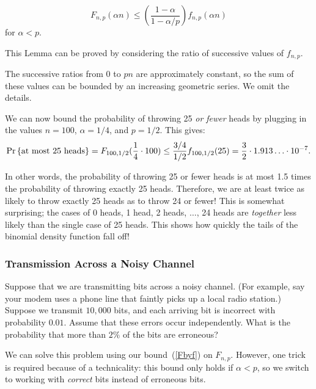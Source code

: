 \documentclass[11pt,twoside]{article}
\begin{document}
\begin{lemma*}
\begin{equation}\label{Fbyf}
F_{n, p}(\alpha n) \leq
\left(\frac{1 - \alpha}{1 - \alpha/p}\right) f_{n, p}(\alpha n)
\end{equation}
for $\alpha < p$.
\end{lemma*}

This Lemma can be proved by considering the ratio of successive values of
$f_{n, p}$.  %

The successive ratios from 0 to $pn$ are approximately
constant, so the sum of these values can be bounded by an increasing
geometric series.  We omit the details.


We can now bound the probability of throwing 25 \emph{or fewer} heads by
plugging in the values $n = 100$, $\alpha = 1/4$, and $p = 1/2$.  This
gives:
\begin{equation*}
\mathop{\textup{Pr}}\nolimits\left\{\mbox{at most 25 heads}\right\}
   = F_{100, 1/2}(\frac{1}{4} \cdot 100)
   \leq \frac{3/4}{1/2} f_{100, 1/2}(25)
   = \frac{3}{2} \cdot 1.913\ldots \cdot 10^{-7}.
\end{equation*}

In other words, the probability of throwing 25 or fewer heads is at most
1.5 times the probability of throwing exactly 25 heads.  Therefore, we are
at least twice as likely to throw exactly 25 heads as to throw 24 or
fewer!  This is somewhat surprising; the cases of 0 heads, 1 head, 2
heads, $\dots$, 24 heads are \emph{together} less likely than the single
case of 25 heads.  This shows how quickly the tails of the binomial
density function fall off!

\subsubsection{Transmission Across a Noisy Channel}\label{noisy}

Suppose that we are transmitting bits across a noisy channel.  (For
example, say your modem uses a phone line that faintly picks up a
local radio station.)  Suppose we transmit $10,000$ bits, and each
arriving bit is incorrect with probability $0.01$.  Assume that these
errors occur independently.  What is the probability that more than
$2\%$ of the bits are erroneous?

We can solve this problem using our bound~(\ref{Fbyf}) on $F_{n,p}$.
However, one trick is required because of a technicality: this bound only
holds if $\alpha < p$, so we switch to working with \emph{correct} bits
instead of erroneous bits.
\end{document}

